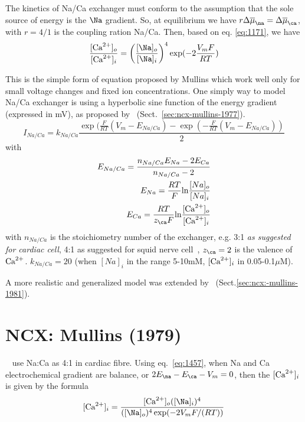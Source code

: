 The kinetics of Na/Ca exchanger must conform to the assumption that
the sole source of energy is the $\Na$ gradient. So, at equilibrium we
have $r\Delta\overline{\mu}_{\na} = \Delta\overline{\mu}_{\ca}$, with $r=4/1$ is
the coupling ration Na/Ca. Then, based on eq. \eqref{eq:1171}, we have
\begin{equation}
  \label{eq:1164}
  \frac{[\Ca]_o}{[\Ca]_i}=\left(\frac{[\Na]_o}{[\Na]_i}\right)^4\exp(-2\frac{V_mF}{RT})
\end{equation}


This is the simple form of equation proposed by Mullins which work
well only for small voltage changes and fixed ion concentrations. 
One simply way to model Na/Ca exchanger is using a hyperbolic sine
function of the energy gradient (expressed in mV), as proposed
by~\citep{mullins1977mnc} (Sect.~\ref{sec:ncx-mullins-1977}).
\begin{equation}
  \label{eq:709}
  I_{Na/Ca} =
  k_{Na/Ca}\frac{\exp(\frac{F}{RT}(V_m-E_{Na/Ca})
    -\exp(-\frac{F}{RT}(V_m-E_{Na/Ca}))}{2}
\end{equation}
with
\begin{equation}
  \label{eq:711}
  \begin{split}
    E_{Na/Ca}=\frac{n_{Na/Ca}E_{Na}-2E_{Ca}}{n_{Na/Ca}-2} \\
    E_{Na} = \frac{RT}{F} \ln \frac{[Na]_o}{[Na]_i}\\
    E_{Ca} =  \frac{RT}{z_\ca F} \ln \frac{[\Ca]_o}{[\Ca]_i}
  \end{split}
\end{equation}
with $n_{Na/Ca}$ is the stoichiometry number of the exchanger,
e.g. 3:1 {\it as suggested for cardiac cell}, 4:1
as suggested for squid nerve cell~\citep{mullins1981}, $z_\ca=2$ is
the valence of ${\text{Ca}^{2+}}$.  $k_{Na/Ca}=20$ (when $[Na]_i$ in the range
5-10mM, $[{\text{Ca}^{2+}}]_i$ in 0.05-0.1$\mu$M).

A more realistic and generalized model was extended
by~\citep{mullins1981} (Sect.\ref{sec:ncx:-mullins-1981}). 

\section{NCX: Mullins (1979)}
\label{sec:ncx:-mullins-1979}

~\citep{mullins1979} use Na:Ca as 4:1 in cardiac fibre. Using
eq.~\eqref{eq:1457}, when Na and Ca electrochemical gradient are
balance, or $2E_\na-E_\ca-V_m=0$, then the $[{\text{Ca}^{2+}}]_i$ is given by the
formula
\begin{equation}
  \label{eq:1456}
  [\Ca]_i = \frac{[\Ca]_o([\Na]_i)^4}{([\Na]_o)^4\exp(-2V_mF/(RT))}
\end{equation}

